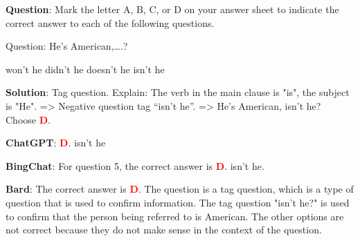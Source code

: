 \documentclass[11pt]{article}
\begin{document}
\begin{mdframed}[linewidth=1pt,linecolor=red] \textbf{Question}: Mark the letter A, B, C, or D on your answer sheet to indicate the correct answer to each of the following questions. 
	
	Question: He’s American,….?
	
	\begin{choices}
		\choice won’t he 
		\choice didn’t he 	
		\choice doesn’t he 
		\choice isn’t he
	\end{choices}
	
	\textbf{Solution}: Tag question. Explain:
	The verb in the main clause is "is", the subject is "He".
	=> Negative question tag “isn't he”.
	=> He's American, isn't he?
	Choose \textcolor{red}{\textbf{D}}. 
	
	\textbf{ChatGPT}: \textcolor{red}{\textbf{D}}. isn't he 
	
	\textbf{BingChat}: For question 5, the correct answer is \textcolor{red}{\textbf{D}}. isn’t he.
	
	\textbf{Bard}: The correct answer is \textcolor{red}{\textbf{D}}. The question is a tag question, which is a type of question that is used to confirm information. The tag question "isn't he?" is used to confirm that the person being referred to is American. The other options are not correct because they do not make sense in the context of the question.
	
		
\end{mdframed}
\end{document}
